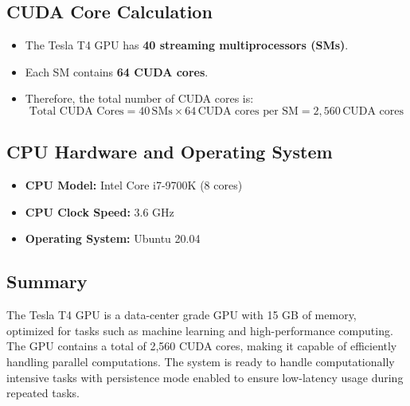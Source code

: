 \documentclass[letterpaper,12pt]{article}
\theoremstyle{remark}
\begin{document}
\subsection{CUDA Core Calculation}
\begin{itemize}
    \item The Tesla T4 GPU has \textbf{40 streaming multiprocessors (SMs)}.
    \item Each SM contains \textbf{64 CUDA cores}.
    \item Therefore, the total number of CUDA cores is:
    \[
    \text{Total CUDA Cores} = 40 \, \text{SMs} \times 64 \, \text{CUDA cores per SM} = 2,560 \, \text{CUDA cores}
    \]
\end{itemize}

\subsection{CPU Hardware and Operating System}
\begin{itemize}
    \item \textbf{CPU Model:} Intel Core i7-9700K (8 cores)
    \item \textbf{CPU Clock Speed:} 3.6 GHz
    \item \textbf{Operating System:} Ubuntu 20.04
\end{itemize}
\normalsize




\subsection{Summary}
The Tesla T4 GPU is a data-center grade GPU with 15 GB of memory, optimized for tasks such as machine learning and high-performance computing. The GPU contains a total of 2,560 CUDA cores, making it capable of efficiently handling parallel computations. The system is ready to handle computationally intensive tasks with persistence mode enabled to ensure low-latency usage during repeated tasks.
\end{document}
